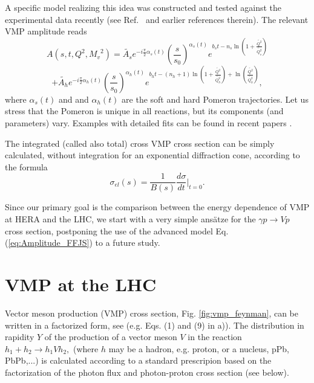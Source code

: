 \documentclass[12pt]{article}
\begin{document}
A specific model realizing this idea was constructed and tested against the experimental data recently (see
Ref.~\cite{FFJS} and earlier references therein). The relevant VMP amplitude reads 
  $$
   A(s,t,Q^2,{M_v}^2)= \widetilde{A_s}e^{-i\frac{\pi}{2}\alpha_s(t)}\left(\frac{s}{s_{0}}\right)^{\alpha_s(t)}
    e^{b_st - n_s\ln{\left(1+\frac{\widetilde{Q^2}}{\widetilde{Q_s^2}}\right)}}
  $$
  \begin{equation}
  +\widetilde{A_h}e^{-i\frac{\pi}{2}\alpha_h(t)}\left(\frac{s}{s_{0}}\right)^{\alpha_h(t)}
    e^{b_ht - (n_h+1)\ln{\left(1+\frac{\widetilde{Q^2}}{\widetilde{Q_h^2}}\right)}
    +\ln{\left(\frac{\widetilde{Q^2}}{\widetilde{Q_h^2}}\right)} },
    \label{eq:Amplitude_FFJS}
    \end{equation}
 where  $\alpha_s(t)$ and and $\alpha_h(t)$ are the soft and hard Pomeron trajectories. Let us 
stress that the Pomeron is unique in all reactions, but its components (and parameters) vary. 
Examples with detailed fits can be found in recent papers \cite{FFJS}.

The integrated (called also total) cross VMP cross section can be simply calculated, without integration for an exponential diffraction cone, according to the formula
$$\sigma_{el}(s)=\frac{1}{B(s)}\frac{d\sigma}{dt}\biggr\rvert_{t=0}.$$ 

Since our primary goal is the comparison between the energy dependence of VMP at HERA and the LHC, we start with a very simple ans\"atze for the $\gamma p\rightarrow Vp$ cross section, postponing the use of the advanced model  
Eq. (\ref{eq:Amplitude_FFJS}) to a future study.

\section{VMP at the LHC} 

Vector meson production (VMP) cross section, Fig. \ref{fig:vmp_feynman}, can be written in a factorized form, see \cite{Brazil, Review} (e.g. Eqs. (1) and (9) in \cite{Brazil}a)).
The distribution in rapidity $Y$ of the production of a vector meson $V$ in the reaction $h_1+h_2\rightarrow h_1Vh_2,$ (where $h$ may be a hadron, e.g. proton, or a nucleus, pPb, PbPb,...) is calculated according to a standard prescripion based on the factorization of the photon flux and photon-proton cross section (see below).
\end{document}
